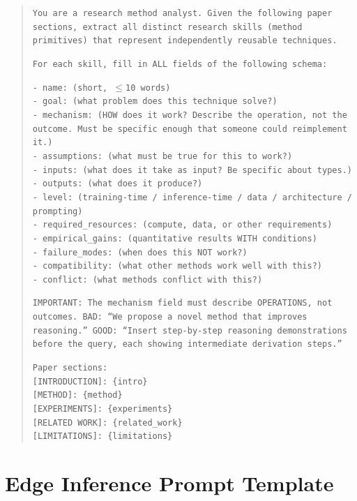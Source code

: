 \begin{quote}
\small
\texttt{You are a research method analyst. Given the following paper sections, extract all distinct research skills (method primitives) that represent independently reusable techniques.}

\texttt{For each skill, fill in ALL fields of the following schema:}

\texttt{- name: (short, $\leq$10 words)}\\
\texttt{- goal: (what problem does this technique solve?)}\\
\texttt{- mechanism: (HOW does it work? Describe the operation, not the outcome. Must be specific enough that someone could reimplement it.)}\\
\texttt{- assumptions: (what must be true for this to work?)}\\
\texttt{- inputs: (what does it take as input? Be specific about types.)}\\
\texttt{- outputs: (what does it produce?)}\\
\texttt{- level: (training-time / inference-time / data / architecture / prompting)}\\
\texttt{- required\_resources: (compute, data, or other requirements)}\\
\texttt{- empirical\_gains: (quantitative results WITH conditions)}\\
\texttt{- failure\_modes: (when does this NOT work?)}\\
\texttt{- compatibility: (what other methods work well with this?)}\\
\texttt{- conflict: (what methods conflict with this?)}

\texttt{IMPORTANT: The mechanism field must describe OPERATIONS, not outcomes. BAD: ``We propose a novel method that improves reasoning.'' GOOD: ``Insert step-by-step reasoning demonstrations before the query, each showing intermediate derivation steps.''}

\texttt{Paper sections:}\\
\texttt{[INTRODUCTION]: \{intro\}}\\
\texttt{[METHOD]: \{method\}}\\
\texttt{[EXPERIMENTS]: \{experiments\}}\\
\texttt{[RELATED WORK]: \{related\_work\}}\\
\texttt{[LIMITATIONS]: \{limitations\}}
\end{quote}

\section{Edge Inference Prompt Template}
\label{app:edge_prompt}

